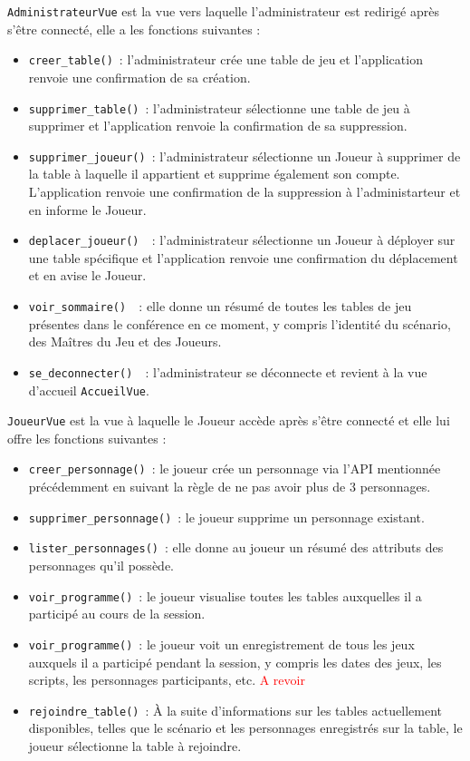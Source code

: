 \documentclass[11pt]{article}
\begin{document}
\texttt{AdministrateurVue} est la vue vers laquelle l'administrateur est redirigé après s'être connecté, elle a les fonctions suivantes :
\begin{itemize}[label=, font=\small]
    \item \texttt{creer\_table()}~: l'administrateur crée une table de jeu et l'application renvoie une confirmation de sa création. 
    \item \texttt{supprimer\_table()}~: l'administrateur sélectionne une table de jeu à supprimer et l'application renvoie la confirmation de sa suppression.
    \item \texttt{supprimer\_joueur()}~: l'administrateur sélectionne un Joueur à supprimer de la table à laquelle il appartient et supprime également son compte. L'application renvoie une confirmation de la suppression à l'administarteur et en informe le Joueur.
    \item \texttt{deplacer\_joueur() }~: l'administrateur sélectionne un Joueur à déployer sur une table spécifique et l'application renvoie une confirmation du déplacement et en avise le Joueur.
    \item \texttt{voir\_sommaire() }~: elle donne un résumé de toutes les tables de jeu présentes dans le conférence en ce moment, y compris l'identité du scénario, des Maîtres du Jeu et des Joueurs.
    \item \texttt{se\_deconnecter() }~: l'administrateur se déconnecte et revient à la vue d'accueil \texttt{AccueilVue}.
\end{itemize}
\bigbreak

\texttt{JoueurVue} est la vue à laquelle le Joueur accède après s'être connecté et elle lui offre les fonctions suivantes :
\begin{itemize}[label=, font=\small]
    \item\texttt{creer\_personnage()}~: le joueur crée un personnage via l'API mentionnée précédemment en suivant la règle de ne pas avoir plus de 3 personnages.
    \item\texttt{supprimer\_personnage()}~: le joueur supprime un personnage existant.
    \item\texttt{lister\_personnages()}~: elle donne au joueur un résumé des attributs des personnages qu'il possède.
    \item\texttt{voir\_programme()}~: le joueur visualise toutes les tables auxquelles il a participé au cours de la session.
    \item\texttt{voir\_programme()}~: le joueur voit un enregistrement de tous les jeux auxquels il a participé pendant la session, y compris les dates des jeux, les scripts, les personnages participants, etc. \textcolor{red}{A revoir}
    \item\texttt{rejoindre\_table()}~: À la suite d'informations sur les tables actuellement disponibles, telles que le scénario et les personnages enregistrés sur la table, le joueur sélectionne la table à rejoindre.
\end{itemize}
\end{document}
